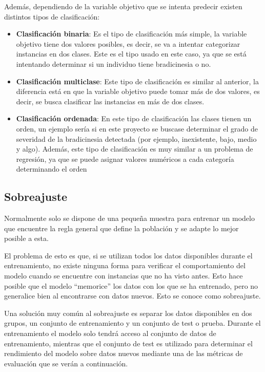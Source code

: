 Además, dependiendo de la variable objetivo que se intenta predecir existen
distintos tipos de clasificación:

\begin{itemize}
    \item \textbf{Clasificación binaria}: Es el tipo de clasificación más
    simple, la variable objetivo tiene dos valores posibles, es decir, se va a
    intentar categorizar instancias en dos clases. Este es el tipo usado en este
    caso, ya que se está intentando determinar si un individuo tiene
    bradicinesia o no.
    \item \textbf{Clasificación multiclase}: Este tipo de clasificación es
    similar al anterior, la diferencia está en que la variable objetivo puede
    tomar más de dos valores, es decir, se busca clasificar las instancias en
    más de dos clases.
    \item \textbf{Clasificación ordenada}: En este tipo de clasificación las
    clases tienen un orden, un ejemplo sería si en este proyecto se buscase
    determinar el grado de severidad de la bradicinesia detectada (por ejemplo,
    inexistente, bajo, medio y algo). Además, este tipo de clasificación es muy
    similar a un problema de regresión, ya que se puede asignar valores
    numéricos a cada categoría determinando el orden
\end{itemize}


\subsection{Sobreajuste}

Normalmente solo se dispone de una pequeña muestra para entrenar un modelo que
encuentre la regla general que define la población y se adapte lo mejor posible
a esta.

El problema de esto es que, si se utilizan todos los datos disponibles durante
el entrenamiento, no existe ninguna forma para verificar el comportamiento del
modelo cuando se encuentre con instancias que no ha visto antes. Esto hace
posible que el modelo ``memorice'' los datos con los que se ha entrenado, pero
no generalice bien al encontrarse con datos nuevos. Esto se conoce como
sobreajuste.


Una solución muy común al sobreajuste es separar los datos disponibles en dos
grupos, un conjunto de entrenamiento y un conjunto de test o prueba. Durante el
entrenamiento el modelo solo tendrá acceso al conjunto de datos de
entrenamiento, mientras que el conjunto de test es utilizado para determinar el
rendimiento del modelo sobre datos nuevos mediante una de las métricas de
evaluación que se verán a continuación.

